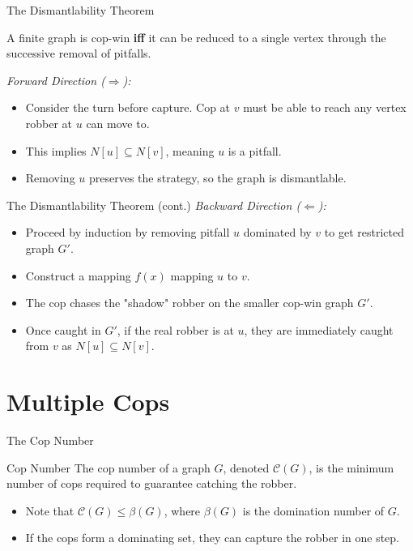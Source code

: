 \documentclass[10pt, aspectratio=169]{beamer}
\begin{document}
\begin{frame}{The Dismantlability Theorem}
    \begin{theorem}
        A finite graph is cop-win \textbf{iff} it can be reduced to a single vertex through the successive removal of pitfalls.
    \end{theorem}
    \textit{Forward Direction ($\Rightarrow$):}
    \begin{itemize}
        \item Consider the turn before capture. Cop at $v$ must be able to reach any vertex robber at $u$ can move to.
        \item This implies $N[u] \subseteq N[v]$, meaning $u$ is a pitfall.
        \item Removing $u$ preserves the strategy, so the graph is dismantlable.
    \end{itemize}
\end{frame}

\begin{frame}{The Dismantlability Theorem (cont.)}
    \textit{Backward Direction ($\Leftarrow$):}
    \begin{itemize}
        \item Proceed by induction by removing pitfall $u$ dominated by $v$ to get restricted graph $G'$.
        \item Construct a mapping $f(x)$ mapping $u$ to $v$.
        \item The cop chases the "shadow" robber on the smaller cop-win graph $G'$.
        \item Once caught in $G'$, if the real robber is at $u$, they are immediately caught from $v$ as $N[u] \subseteq N[v]$.
    \end{itemize}
\end{frame}

\section{Multiple Cops}

\begin{frame}{The Cop Number}
    \begin{alertblock}{Cop Number}
        The cop number of a graph $G$, denoted $\mathcal{C}(G)$, is the minimum number of cops required to guarantee catching the robber.
    \end{alertblock}
    \begin{itemize}
        \item Note that $\mathcal{C}(G) \le \beta(G)$, where $\beta(G)$ is the domination number of $G$.
        \item If the cops form a dominating set, they can capture the robber in one step.
    \end{itemize}
\end{frame}
\end{document}
